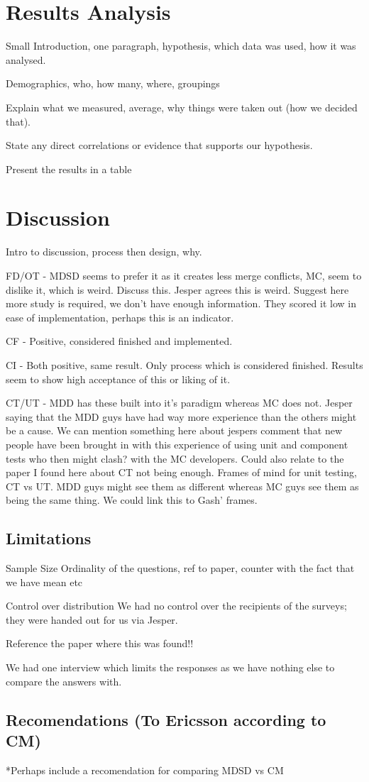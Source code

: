 \documentclass[final_report_innit.tex]{subfiles}
\begin{document}
\section{Results Analysis}

Small Introduction, one paragraph, hypothesis, which data was used, how it was analysed.

Demographics, who, how many, where, groupings

Explain what we measured, average, why things were taken out (how we decided that).

State any direct correlations or evidence that supports our hypothesis.

Present the results in a table

\section{Discussion}

Intro to discussion, process then design, why.

FD/OT - MDSD seems to prefer it as it creates less merge conflicts, MC, seem to dislike it, which is weird. Discuss this. Jesper agrees this is weird. Suggest here more study is required, we don't have enough information. They scored it low in ease of implementation, perhaps this is an indicator.

CF - Positive, considered finished and implemented. 

CI - Both positive, same result. Only process which is considered finished. Results seem to show high acceptance of this or liking of it.

CT/UT - MDD has these built into it's paradigm whereas MC does not. Jesper saying that the MDD guys have had way more experience than the others might be a cause. We can mention something here about jespers comment that new people have been brought in with this experience of using unit and component tests who then might clash? with the MC developers. Could also relate to the paper I found here about CT not being enough. Frames of mind for unit testing, CT vs UT. MDD guys might see them as different whereas MC guys see them as being the same thing. We could link this to Gash' frames.

\subsection*{Limitations}

Sample Size
Ordinality of the questions, ref to paper, counter with the fact that we have mean etc

Control over distribution
We had no control over the recipients of the surveys; they were handed out for us via Jesper.

Reference the paper where this was found!!

We had one interview which limits the responses as we have nothing else to compare the answers with.

\subsection*{Recomendations (To Ericsson according to CM)}

*Perhaps include a recomendation for comparing MDSD vs CM
\end{document}
